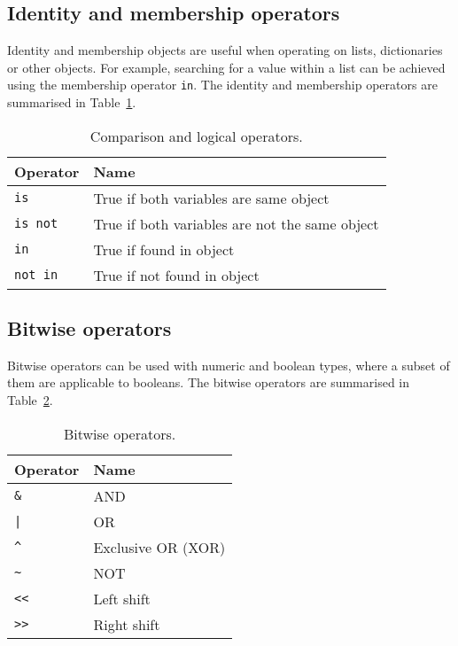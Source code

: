 \documentclass[11pt,a4paper]{article}
\begin{document}
\subsection{Identity and membership operators \label{section:id-mem-operators}}

Identity and membership objects are useful when operating on lists, dictionaries or other objects.  For example, searching for a value within a list can be achieved using the membership operator \texttt{in}.  The identity and membership operators are summarised in Table~\ref{table:id-mem-operators}.
%
\begin{table}[h!!]
  \begin{center}
    \caption{Comparison and logical operators.}
    \label{table:id-mem-operators}
    \begin{tabular}{l|l} \hline
      \textbf{Operator} & \textbf{Name}\\
      \hline
      \texttt{is} & True if both variables are same object\\
      \texttt{is not} & True if both variables are not the same object\\
      \texttt{in} & True if found in object\\
      \texttt{not in} & True if not found in object\\ \hline
    \end{tabular}
  \end{center}
\end{table}

\subsection{Bitwise operators \label{section:bitwise-operators}}

Bitwise operators can be used with numeric and boolean types, where a subset of them are applicable to booleans.  The bitwise operators are summarised in Table~\ref{table:bitwise-operators}.
\begin{table}[h!!]
  \begin{center}
    \caption{Bitwise operators.}
    \label{table:bitwise-operators}
    \begin{tabular}{l|l} \hline
      \textbf{Operator} & \textbf{Name}\\
      \hline
      \texttt{\&} & AND\\
      \texttt{|} & OR\\
      \texttt{\^{}} & Exclusive OR (XOR)\\
      \texttt{\~} & NOT\\
      \texttt{<<} & Left shift\\
      \texttt{>>} & Right shift\\ \hline
    \end{tabular}
  \end{center}
\end{table}
\end{document}
